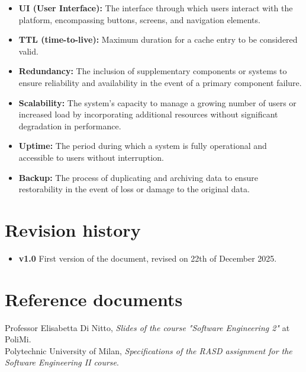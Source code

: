 \documentclass{Configuration_Files/PoliMi3i_thesis}
\begin{document}
\begin{itemize}
    \item \textbf{UI (User Interface):} The interface through which users interact with the platform, encompassing buttons, screens, and navigation elements.
    \item \textbf{TTL (time-to-live):} Maximum duration for a cache entry to be considered valid.
    \item \textbf{Redundancy:} The inclusion of supplementary components or systems to ensure reliability and availability in the event of a primary component failure.
    \item \textbf{Scalability:} The system's capacity to manage a growing number of users or increased load by incorporating additional resources without significant degradation in performance.
    \item \textbf{Uptime:} The period during which a system is fully operational and accessible to users without interruption.
    \item \textbf{Backup:} The process of duplicating and archiving data to ensure restorability in the event of loss or damage to the original data.
    

\end{itemize}

\section{Revision history}
\begin{itemize}
    \item \textbf{v1.0} First version of the document, revised on 22th of December 2025.
\end{itemize}

\section{Reference documents}
Professor Elisabetta Di Nitto, \textit{Slides of the course "Software Engineering 2"} at PoliMi.
\\ 
Polytechnic University of Milan, \textit{Specifications of the RASD assignment for the Software Engineering II course}.
\end{document}
